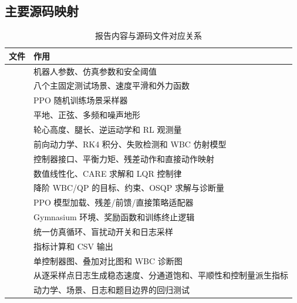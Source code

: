 \documentclass[UTF8,12pt,a4paper,fontset=none]{ctexart}
\begin{document}
\subsection{主要源码映射}
\begin{table}[!htb]
\centering
\caption{报告内容与源码文件对应关系}
\label{tab:codemap}
\footnotesize
\begin{tabularx}{\linewidth}{p{6.8cm}Y}
\toprule
文件 & 作用 \\
\midrule
{} & 机器人参数、仿真参数和安全阈值 \\
 & 八个主固定测试场景、速度平滑和外力函数 \\
 & PPO 随机训练场景采样器 \\
 & 平地、正弦、多频和噪声地形 \\
 & 轮心高度、腿长、逆运动学和 RL 观测量 \\
 & 前向动力学、RK4 积分、失败检测和 WBC 仿射模型 \\
 & 控制器接口、平衡力矩、残差动作和直接动作映射 \\
 & 数值线性化、CARE 求解和 LQR 控制律 \\
 & 降阶 WBC/QP 的目标、约束、OSQP 求解与诊断量 \\
 & PPO 模型加载、残差/前馈/直接策略适配器 \\
 & Gymnasium 环境、奖励函数和训练终止逻辑 \\
 & 统一仿真循环、盲扰动开关和日志采样 \\
 & 指标计算和 CSV 输出 \\
 & 单控制器图、叠加对比图和 WBC 诊断图 \\
 & 从逐采样点日志生成稳态速度、分通道饱和、平顺性和控制量派生指标 \\
 & 动力学、场景、日志和题目边界的回归测试 \\
\bottomrule
\end{tabularx}
\end{table}
\end{document}
